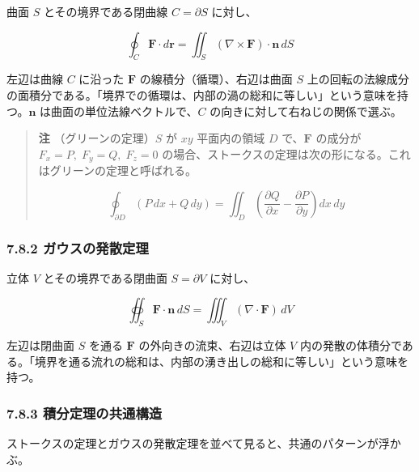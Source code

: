 \documentclass[a4paper,12pt,openany]{book}
\begin{document}
曲面 \(S\) とその境界である閉曲線 \(C = \partial S\) に対し、

\[\oint_C \mathbf{F} \cdot d\mathbf{r} = \iint_S (\nabla \times \mathbf{F}) \cdot \mathbf{n}\,dS\]

左辺は曲線 \(C\) に沿った \(\mathbf{F}\) の線積分（循環）、右辺は曲面
\(S\)
上の回転の法線成分の面積分である。「境界での循環は、内部の渦の総和に等しい」という意味を持つ。\(\mathbf{n}\)
は曲面の単位法線ベクトルで、\(C\) の向きに対して右ねじの関係で選ぶ。

\begin{quote}
\textbf{注} （グリーンの定理）\(S\) が \(xy\) 平面内の領域 \(D\)
で、\(\mathbf{F}\) の成分が \(F_x=P,\;F_y=Q,\;F_z=0\)
の場合、ストークスの定理は次の形になる。これはグリーンの定理と呼ばれる。

\[\oint_{\partial D} (P\,dx + Q\,dy) = \iint_D \left(\frac{\partial Q}{\partial x} - \frac{\partial P}{\partial y}\right) dx\,dy\]
\end{quote}

\hypertarget{ux30acux30a6ux30b9ux306eux767aux6563ux5b9aux7406}{%
\subsubsection{7.8.2
ガウスの発散定理}\label{ux30acux30a6ux30b9ux306eux767aux6563ux5b9aux7406}}

立体 \(V\) とその境界である閉曲面 \(S = \partial V\) に対し、

\[\oiint_S \mathbf{F} \cdot \mathbf{n}\,dS = \iiint_V (\nabla \cdot \mathbf{F})\,dV\]

左辺は閉曲面 \(S\) を通る \(\mathbf{F}\) の外向きの流束、右辺は立体
\(V\)
内の発散の体積分である。「境界を通る流れの総和は、内部の湧き出しの総和に等しい」という意味を持つ。

\hypertarget{ux7a4dux5206ux5b9aux7406ux306eux5171ux901aux69cbux9020}{%
\subsubsection{7.8.3
積分定理の共通構造}\label{ux7a4dux5206ux5b9aux7406ux306eux5171ux901aux69cbux9020}}

ストークスの定理とガウスの発散定理を並べて見ると、共通のパターンが浮かぶ。
\end{document}
